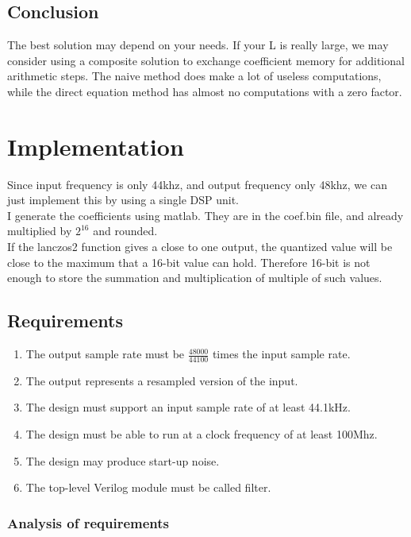 \documentclass[a4paper,twoside,11pt, fleqn]{article}
\begin{document}
\subsection{Conclusion}
The best solution may depend on your needs. If your L is really large, we may consider using a composite solution to exchange coefficient memory for additional arithmetic steps. The naive method does make a lot of useless computations, while the direct equation method has almost no computations with a zero factor.\\


\newpage
\section{Implementation}
Since input frequency is only 44khz, and output frequency only 48khz, we can just implement this by using a single DSP unit.\\

I generate the coefficients using matlab. They are in the coef.bin file, and already multiplied by $2^{16}$ and rounded.\\

If the lanczos2 function gives a close to one output, the quantized value will be close to the maximum that a 16-bit value can hold. Therefore 16-bit is not enough to store the summation and multiplication of multiple of such values.\\

\subsection{Requirements}
\begin{enumerate}
	\item The output sample rate must be $\frac{48000}{44100}$ times the input sample rate.
	\item The output represents a resampled version of the input.
	\item The design must support an input sample rate of at least 44.1kHz.
	\item The design must be able to run at a clock frequency of at least 100Mhz.
	\item The design may produce start-up noise.
	\item The top-level Verilog module must be called filter.
\end{enumerate}


\subsubsection{Analysis of requirements}
\end{document}
